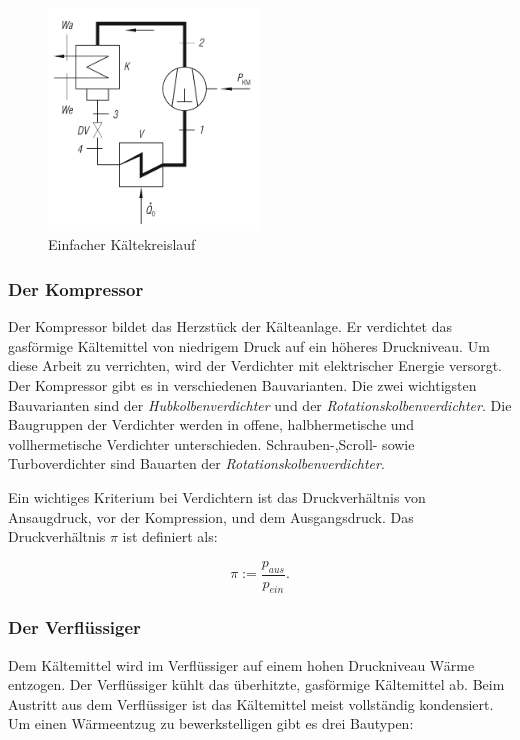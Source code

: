\begin{figure}[htb]
\centering		\includegraphics[width=0.50\textwidth]{Pictures/Kaltekreislauf_beahr.png}
\caption{Einfacher Kältekreislauf \citep{Baehr2013}}
\label{fig:einfacher Kältekreislauf}
\end{figure}

\subsubsection*{Der Kompressor}
Der Kompressor bildet das Herzstück der Kälteanlage. Er verdichtet das gasförmige Kältemittel von niedrigem Druck auf ein höheres Druckniveau. Um diese Arbeit zu verrichten, wird der Verdichter mit elektrischer Energie versorgt. Der Kompressor gibt es in verschiedenen Bauvarianten. Die zwei wichtigsten Bauvarianten sind der \textit{Hubkolbenverdichter} und der \textit{Rotationskolbenverdichter}. Die Baugruppen der Verdichter werden in offene, halbhermetische und vollhermetische Verdichter unterschieden. Schrauben-,Scroll- sowie Turboverdichter sind Bauarten der \textit{Rotationskolbenverdichter}. 



Ein wichtiges Kriterium bei Verdichtern ist das Druckverhältnis von Ansaugdruck, vor der Kompression, und dem Ausgangsdruck. Das Druckverhältnis $\pi$ ist definiert als:



\begin{equation}
\pi := \frac{p_{aus}}{p_{ein}}.
\label{Druckverhältnis}
\end{equation}

\subsubsection*{Der Verflüssiger}

Dem Kältemittel wird im Verflüssiger auf einem hohen Druckniveau Wärme entzogen. Der Verflüssiger kühlt das überhitzte, gasförmige Kältemittel ab. Beim Austritt aus dem Verflüssiger ist das Kältemittel meist vollständig kondensiert. 
Um einen Wärmeentzug zu bewerkstelligen gibt es drei Bautypen:

